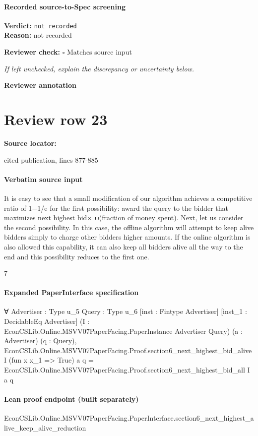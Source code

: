 \documentclass[10pt]{article}
\newcommand{\reviewerbox}{%
  \par\noindent\fbox{\parbox{0.96\linewidth}{\rule{0pt}{0.38in}}}\par
}
\newcommand{\reviewmatch}[1]{%
  \par\noindent\textbf{Reviewer check:} $\square$\; #1\par
  \noindent\emph{If left unchecked, explain the discrepancy or uncertainty below.}\par
}
\begin{document}
\paragraph{Recorded source-to-Spec screening}
\textbf{Verdict:} \texttt{not recorded}
\\
\textbf{Reason:} not recorded
\reviewmatch{Matches source input}
\noindent\textbf{Reviewer annotation}\par
\reviewerbox
\clearpage
\hypertarget{source-claim-3321ada5aace06ac}{}
\section*{Review row 23}
\textbf{Source locator:} {\footnotesize\raggedright cited publication, lines 877-\allowbreak{}885\par}
\paragraph{Verbatim source input}
\begin{ReviewVerbatim}
It is easy to see that a small modification of our algorithm achieves a competitive ratio of
1−1/e for the first possibility: award the query to the bidder that maximizes next highest bid×
ψ(fraction of money spent). Next, let us consider the second possibility. In this case, the offline
algorithm will attempt to keep alive bidders simply to charge other bidders higher amounts.
If the online algorithm is also allowed this capability, it can also keep all bidders alive all the
way to the end and this possibility reduces to the first one.

7
\end{ReviewVerbatim}


\paragraph{Expanded PaperInterface specification}
\begin{ReviewVerbatim}
∀ {Advertiser : Type u_5} {Query : Type u_6} [inst : Fintype Advertiser] [inst_1 : DecidableEq Advertiser]
  (I : EconCSLib.Online.MSVV07PaperFacing.PaperInstance Advertiser Query) (a : Advertiser) (q : Query),
  EconCSLib.Online.MSVV07PaperFacing.Proof.section6_next_highest_bid_alive I (fun x x_1 => True) a q =
    EconCSLib.Online.MSVV07PaperFacing.Proof.section6_next_highest_bid_all I a q
\end{ReviewVerbatim}

\paragraph{Lean proof endpoint (built separately)}\begin{ReviewVerbatim}
EconCSLib.Online.MSVV07PaperFacing.PaperInterface.section6_next_highest_alive_keep_alive_reduction
\end{ReviewVerbatim}
\end{document}
